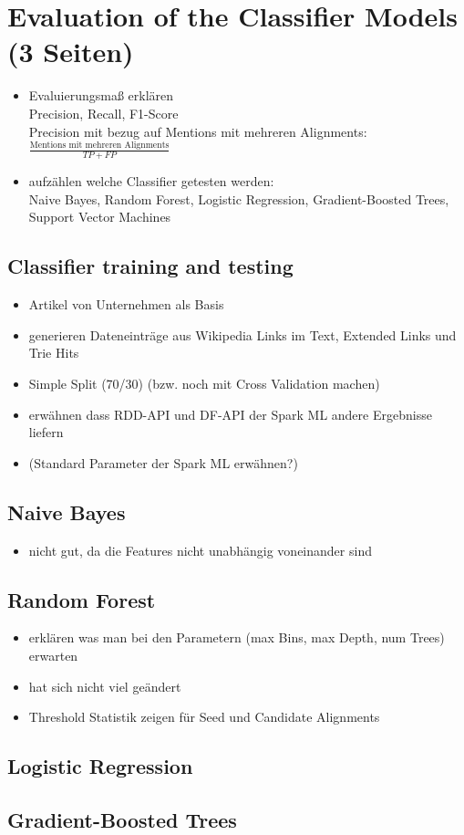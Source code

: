 \section{Evaluation of the Classifier Models (3 Seiten)}
\begin{itemize}
	\item Evaluierungsmaß erklären\\
	Precision, Recall, F1-Score\\
	Precision mit bezug auf Mentions mit mehreren Alignments: $\frac{\text{Mentions mit mehreren Alignments}}{TP + FP}$
	\item aufzählen welche Classifier getesten werden:\\
	Naive Bayes, Random Forest, Logistic Regression, Gradient-Boosted Trees, Support Vector Machines
\end{itemize}
	\subsection{Classifier training and testing}
	\begin{itemize}
		\item Artikel von Unternehmen als Basis
		\item generieren Dateneinträge aus Wikipedia Links im Text, Extended Links und Trie Hits
		\item Simple Split (70/30) (bzw. noch mit Cross Validation machen)
		\item erwähnen dass RDD-API und DF-API der Spark ML andere Ergebnisse liefern
		\item (Standard Parameter der Spark ML erwähnen?)
	\end{itemize}

	\subsection{Naive Bayes}
	\begin{itemize}
		\item nicht gut, da die Features nicht unabhängig voneinander sind
	\end{itemize}
	\subsection{Random Forest}
	\begin{itemize}
		\item erklären was man bei den Parametern (max Bins, max Depth, num Trees) erwarten
		\item hat sich nicht viel geändert
		\item Threshold Statistik zeigen für Seed und Candidate Alignments
	\end{itemize}
	\subsection{Logistic Regression}
	\subsection{Gradient-Boosted Trees}
